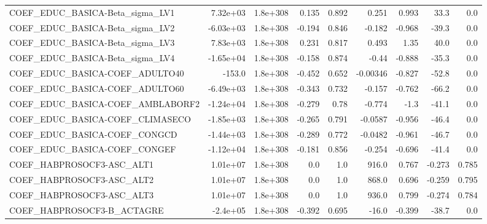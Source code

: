 \begin{tabular}{lrrrrrrrr}
COEF\_EDUC\_BASICA-Beta\_sigma\_LV1   &    7.32e+03 &     1.8e+308 &    0.135 &    0.892 &      0.251 &       0.993 &         33.3 &           0.0 \\
COEF\_EDUC\_BASICA-Beta\_sigma\_LV2   &   -6.03e+03 &     1.8e+308 &   -0.194 &    0.846 &     -0.182 &      -0.968 &        -39.3 &           0.0 \\
COEF\_EDUC\_BASICA-Beta\_sigma\_LV3   &    7.83e+03 &     1.8e+308 &    0.231 &    0.817 &      0.493 &        1.35 &         40.0 &           0.0 \\
COEF\_EDUC\_BASICA-Beta\_sigma\_LV4   &   -1.65e+04 &     1.8e+308 &   -0.158 &    0.874 &      -0.44 &      -0.888 &        -35.3 &           0.0 \\
COEF\_EDUC\_BASICA-COEF\_ADULTO40    &      -153.0 &     1.8e+308 &   -0.452 &    0.652 &   -0.00346 &      -0.827 &        -52.8 &           0.0 \\
COEF\_EDUC\_BASICA-COEF\_ADULTO60    &   -6.49e+03 &     1.8e+308 &   -0.343 &    0.732 &     -0.157 &      -0.762 &        -66.2 &           0.0 \\
COEF\_EDUC\_BASICA-COEF\_AMBLABORF2  &   -1.24e+04 &     1.8e+308 &   -0.279 &     0.78 &     -0.774 &        -1.3 &        -41.1 &           0.0 \\
COEF\_EDUC\_BASICA-COEF\_CLIMASECO   &   -1.85e+03 &     1.8e+308 &   -0.265 &    0.791 &    -0.0587 &      -0.956 &        -46.4 &           0.0 \\
COEF\_EDUC\_BASICA-COEF\_CONGCD      &   -1.44e+03 &     1.8e+308 &   -0.289 &    0.772 &    -0.0482 &      -0.961 &        -46.7 &           0.0 \\
COEF\_EDUC\_BASICA-COEF\_CONGEF      &   -1.12e+04 &     1.8e+308 &   -0.181 &    0.856 &     -0.254 &      -0.696 &        -41.4 &           0.0 \\
COEF\_HABPROSOCF3-ASC\_ALT1         &    1.01e+07 &     1.8e+308 &      0.0 &      1.0 &      916.0 &       0.767 &       -0.273 &         0.785 \\
COEF\_HABPROSOCF3-ASC\_ALT2         &    1.01e+07 &     1.8e+308 &      0.0 &      1.0 &      868.0 &       0.696 &       -0.259 &         0.795 \\
COEF\_HABPROSOCF3-ASC\_ALT3         &    1.01e+07 &     1.8e+308 &      0.0 &      1.0 &      936.0 &       0.799 &       -0.274 &         0.784 \\
COEF\_HABPROSOCF3-B\_ACTAGRE        &    -2.4e+05 &     1.8e+308 &   -0.392 &    0.695 &      -16.0 &      -0.399 &        -38.7 &           0.0 \\

\end{tabular}
